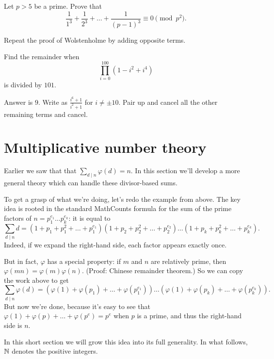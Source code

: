 \documentclass[11pt]{scrartcl}
\begin{document}
\begin{problem}
	Let $p > 5$ be a prime.
	Prove that
	\[ \frac{1}{1^3} + \frac{1}{2^3} + \dots + \frac{1}{(p-1)^3}
		\equiv 0 \pmod{p^2}. \]
	\begin{hint}
		Repeat the proof of Wolstenholme by adding opposite terms.
	\end{hint}
\end{problem}

\begin{problem}
	Find the remainder when
	\[ \prod_{i=0}^{100} (1-i^2+i^4) \]
	is divided by $101$.
	\begin{hint}
		Answer is $9$.
		Write as $\frac{i^6+1}{i^2+1}$ for $i \neq \pm 10$.
		Pair up and cancel all the other remaining terms and cancel.
	\end{hint}
\end{problem}

\section{Multiplicative number theory}
Earlier we saw that that $\sum_{d \mid n} \varphi(d) = n$.
In this section we'll develop a more general theory
which can handle these divisor-based sums.

To get a grasp of what we're doing, let's redo the example from above.
The key idea is rooted in the standard MathCounts formula for
the sum of the prime factors of $n = p_1^{e_1} \dots p_k^{e_k}$:
it is equal to
\[
	\sum_{d \mid n} d
	= \left( 1 + p_1 + p_1^2 + \dots + p_1^{e_1} \right)
	\left( 1 + p_2 + p_2^2 + \dots + p_2^{e_2} \right)
	\dots
	\left( 1 + p_k + p_k^2 + \dots + p_k^{e_k} \right).
\]
Indeed, if we expand the right-hand side, each factor appears exactly once.

But in fact, $\varphi$ has a special property:
if $m$ and $n$ are relatively prime,
then $\varphi(mn) = \varphi(m)\varphi(n)$.
(Proof: Chinese remainder theorem.)
So we can copy the work above to get
\[
	\sum_{d \mid n} \varphi(d)
	= \left( \varphi(1) + \varphi(p_1) + \dots + \varphi(p_1^{e_1}) \right)
	\dots
	\left( \varphi(1) + \varphi(p_k) + \dots + \varphi(p_k^{e_k}) \right).
\]
But now we're done,
because it's easy to see that $\varphi(1) + \varphi(p) + \dots + \varphi(p^e) = p^e$
when $p$ is a prime, and thus the right-hand side is $n$.

In this short section we will grow this idea into its full generality.
In what follows, $\mathbb N$ denotes the positive integers.
\end{document}
